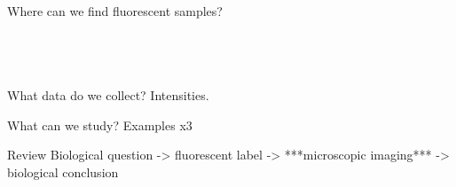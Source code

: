 \documentclass[presentation]{beamer}
\begin{document}
\begin{frame}{Where can we find fluorescent samples?}
\begin{columns}
\begin{column}{.33\textwidth}
      \\
    \end{column}
  \end{columns}
\end{frame}

\begin{frame}{What data do we collect?}
  Intensities. 
\end{frame}

\begin{frame}{What can we study?}
  Examples x3
\end{frame}

\begin{frame}{Review}
  Biological question -> fluorescent label -> ***microscopic imaging*** ->
  biological conclusion
\end{frame}
\end{document}
